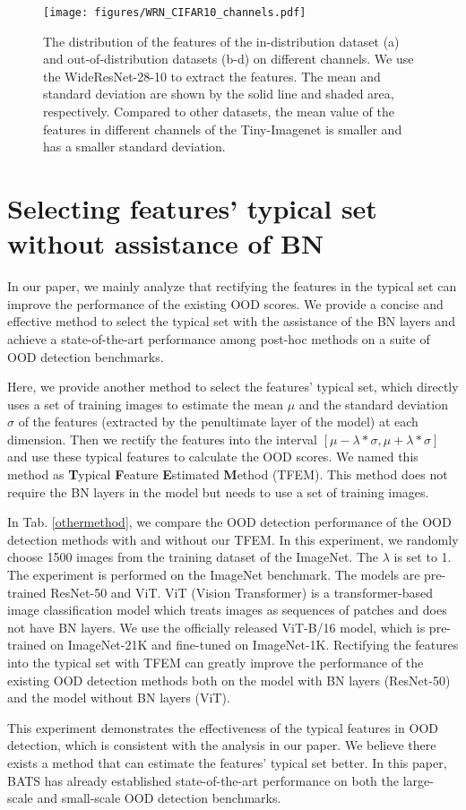 \documentclass{article}
\begin{document}
\begin{figure}[htbp] 
\centering
\texttt{[image: figures/WRN\_CIFAR10\_channels.pdf]}
\caption{The distribution of the features of the in-distribution dataset (a) and out-of-distribution datasets (b-d) on different channels. We use the WideResNet-28-10 to extract the features. The mean and standard deviation are shown by the solid line and shaded area, respectively. Compared to other datasets, the mean value of the features in different channels of the Tiny-Imagenet is smaller and has a smaller standard deviation.}
\label{img:cifar10_channels}
\end{figure}


{
\section{Selecting features' typical set without assistance of BN}
In our paper, we mainly analyze that rectifying the features in the typical set can improve the performance of the existing OOD scores. We provide a concise and effective method to select the typical set with the assistance of the BN layers and achieve a state-of-the-art performance among post-hoc methods on a suite of OOD detection benchmarks. 

Here, we provide another method to select the features' typical set, which directly uses a set of training images to estimate the mean $\mu$ and the standard deviation $\sigma$ of the features (extracted by the penultimate layer of the model) at each dimension. Then we rectify the features into the interval $[\mu-\lambda*\sigma, \mu+\lambda*\sigma]$ and use these typical features to calculate the OOD scores. We named this method as \textbf{T}ypical \textbf{F}eature \textbf{E}stimated \textbf{M}ethod (TFEM). This method does not require the BN layers in the model but needs to use a set of training images. 

In Tab. \ref{othermethod}, we compare the OOD detection performance of the OOD detection methods with and without our TFEM. In this experiment, we randomly choose 1500 images from the training dataset of the ImageNet. The $\lambda$ is set to 1. The experiment is performed on the ImageNet benchmark. The models are pre-trained ResNet-50 and ViT. ViT (Vision Transformer) \cite{dosovitskiy2020imageVIT} is a transformer-based image classification model which treats images as sequences of patches and does not have BN layers. We use the officially released ViT-B/16 model, which is pre-trained on ImageNet-21K and fine-tuned on ImageNet-1K. Rectifying the features into the typical set with TFEM can greatly improve the performance of the existing OOD detection methods both on the model with BN layers (ResNet-50) and the model without BN layers (ViT).

This experiment demonstrates the effectiveness of the typical features in OOD detection, which is consistent with the analysis in our paper.
We believe there exists a method that can estimate the features' typical set better. In this paper, BATS has already established state-of-the-art performance on both the large-scale and small-scale OOD detection benchmarks.
}
\end{document}
